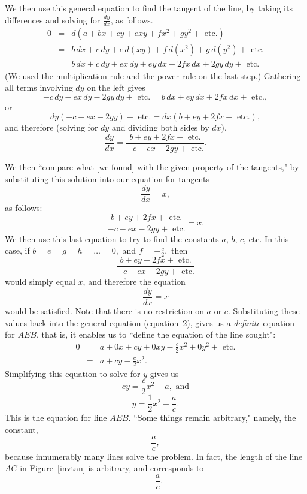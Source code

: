 \documentclass[twoside,openright]{article}
\begin{document}
 We then use this general equation to find the tangent of the line, by
 taking its differences and solving for
$\frac{dy}{dx}$, as follows.
\begin{eqnarray*}
0 & = & d(a + bx + cy + exy + fx^2 + gy^2 + \mbox{ etc.}) \\
& = & b\,dx + c\,dy + e\,d(xy) + f\,d(x^2) + g\,d(y^2) +\mbox{ etc.}\\
& = & b\,dx + c\,dy + ex\,dy + ey\,dx + 2fx\,dx + 2gy\,dy + \mbox{ etc.}
\end{eqnarray*}
(We used the multiplication rule and the power rule on the last step.)
Gathering all terms involving $dy$ on the left gives
$$ - c\,dy -ex\,dy - 2gy\,dy + \mbox{ etc.} = b\,dx + ey\,dx + 2fx\,dx +\mbox{ etc.},$$
or
$$dy( - c -ex - 2gy) + \mbox{ etc.} = dx(b + ey + 2fx +\mbox{ etc.}),$$
and therefore (solving for $dy$ and dividing both sides by $dx$),
$$\frac{dy}{dx} = \frac{b + ey + 2fx +\mbox{ etc.}}{- c - ex - 2gy +\mbox{ etc.}}.$$

We then ``compare what [we found] with the given property of the
tangents," by substituting this solution into our equation for
tangents
$$\frac{dy}{dx} = x,$$
as follows:
$$ \frac{b + ey + 2fx +\mbox{ etc.}}{- c - ex - 2gy +\mbox{ etc.}} = x.$$
We then use this last equation to try to find the constants $a$,
$b$, $c$, etc.
In this case, if
$b = e = g = h = \ldots = 0,$ and  $f = -\frac{c}{2},$ then 
$$\frac{b + ey + 2fx +\mbox{ etc.}}{- c - ex - 2gy +\mbox{ etc.}}$$
would simply equal $x$, and therefore the equation 
$$\frac{dy}{dx} =x$$ 
would be satisfied.
Note that there is no restriction on $a$ or $c$.  Substituting these
values back into the general equation (equation~2), gives us a {\em
  definite} equation for $AEB$, that is, it enables us to ``define the
equation of the line sought":
\begin{eqnarray*}
  0 & = & a + 0x + cy + 0xy - \frac{c}{2}x^2 + 0y^2 + \mbox{ etc.}\\
    & = & a + cy - \frac{c}{2}x^2.
\end{eqnarray*}
Simplifying this equation to solve for $y$ gives us
$$cy  =  \frac{c}{2}x^2 - a,\mbox{ and}$$
\begin{equation}
y  =  \frac{1}{2}x^2 - \frac{a}{c}.
\end{equation}
This is the equation for line $AEB$.  ``Some things remain arbitrary," namely, the constant, 
$$\frac{a}{c},$$
because innumerably many lines solve the problem.  In fact, the length
of the line $AC$ in Figure~\ref{invtan} is arbitrary, and corresponds
to
$$-\frac{a}{c}.$$
\setcounter{equation}{0}
\end{document}
